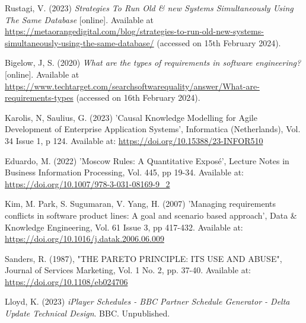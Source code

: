 \noindent Rustagi, V. (2023) \textit{Strategies To Run Old \& new Systems Simultaneously Using The Same Database} [online]. Available at \url{https://metaorangedigital.com/blog/strategies-to-run-old-new-systems-simultaneously-using-the-same-database/} (accessed on 15th February 2024).
\vspace{0.2cm}

\noindent Bigelow, J, S. (2020) \textit{What are the types of requirements in software engineering?} [online]. Available at \url{https://www.techtarget.com/searchsoftwarequality/answer/What-are-requirements-types} (accessed on 16th February 2024).
\vspace{0.2cm}

\noindent Karolis, N, Saulius, G. (2023) 'Causal Knowledge Modelling for Agile Development of Enterprise Application Systems', Informatica (Netherlands), Vol. 34 Issue 1, p 124. Available at: \url{https://doi.org/10.15388/23-INFOR510}
\vspace{0.2cm}

\noindent Eduardo, M. (2022) 'Moscow Rules: A Quantitative Exposé', Lecture Notes in Business Information Processing, Vol. 445, pp 19-34. Available at: \url{https://doi.org/10.1007/978-3-031-08169-9_2}
\vspace{0.2cm}

\noindent Kim, M. Park, S. Sugumaran, V. Yang, H. (2007) 'Managing requirements conflicts in software product lines: A goal and scenario based approach', Data \& Knowledge Engineering, Vol. 61 Issue 3, pp 417-432. Available at: \url{https://doi.org/10.1016/j.datak.2006.06.009}
\vspace{0.2cm}

\noindent Sanders, R. (1987), "THE PARETO PRINCIPLE: ITS USE AND ABUSE", Journal of Services Marketing, Vol. 1 No. 2, pp. 37-40. Available at: \url{https://doi.org/10.1108/eb024706 }
\vspace{0.2cm}

\noindent Lloyd, K. (2023) \textit{iPlayer Schedules - BBC Partner Schedule Generator - Delta Update Technical Design}. BBC. Unpublished.
\vspace{0.2cm}

\newpage
